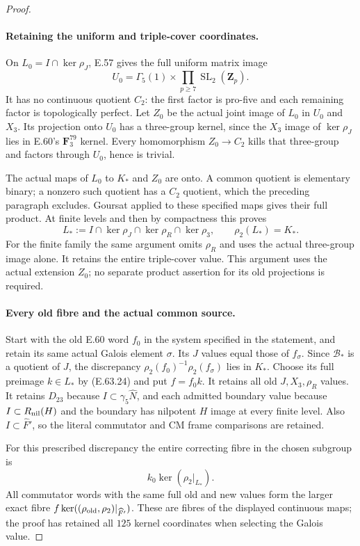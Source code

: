 \begin{proof}
\paragraph{Retaining the uniform and triple-cover coordinates.}
On $L_0=I\cap\ker\rho_J$, E.57 gives the full
uniform matrix image
\[
 U_0=\Gamma_5(1)\times
                  \prod_{p\ge7}\operatorname{SL}_2(\mathbf Z_p).
 \tag{E.63.23}
\]
It has no continuous quotient $C_2$: the first
factor is pro-five and each remaining factor is
topologically perfect. Let $Z_0$ be the actual
joint image of $L_0$ in $U_0$ and $X_3$.
Its projection onto $U_0$ has a three-group kernel,
since the $X_3$ image of $\ker\rho_J$ lies in
E.60's $\mathbf F_3^{79}$ kernel. Every homomorphism
$Z_0\to C_2$ kills that three-group and factors
through $U_0$, hence is trivial.

The actual maps of $L_0$ to $K_*$ and $Z_0$ are
onto. A common quotient is elementary binary; a
nonzero such quotient has a $C_2$ quotient, which
the preceding paragraph excludes. Goursat applied
to these specified maps gives their full product.
At finite levels and then by compactness this proves
\[
 L_*:=I\cap\ker\rho_J\cap\ker\rho_R\cap\ker\rho_3,
             \qquad\rho_2(L_*)=K_*.
 \tag{E.63.24}
\]
For the finite family the same argument omits
$\rho_R$ and uses the actual three-group image
alone. It retains the entire triple-cover value.
This argument uses the actual extension $Z_0$;
no separate product assertion for its old projections
is required.

\paragraph{Every old fibre and the actual common source.}
Start with the old E.60 word $f_0$ in the system
specified in the statement, and retain its same
actual Galois element $\sigma$. Its $J$ values
equal those of $f_\sigma$. Since
$\mathcal B_*$ is a quotient of $J$, the discrepancy
$\rho_2(f_0)^{-1}\rho_2(f_\sigma)$ lies in $K_*$.
Choose its full preimage $k\in L_*$ by
\textup{(E.63.24)} and put $f=f_0k$.
It retains all old $J,X_3,\rho_R$ values. It retains
$D_{23}$ because $I\subset\gamma_5\widehat N$,
and each admitted boundary value because
$I\subset R_{\rm nil}(H)$ and the boundary has
nilpotent $H$ image at every finite level.
Also $I\subset\widehat F'$, so the literal
commutator and CM frame comparisons are retained.

For this prescribed discrepancy the entire correcting
fibre in the chosen subgroup is
\[
                      k_0\ker(\rho_2|_{L_*}).
 \tag{E.63.25}
\]
All commutator words with the same full old and new
values form the larger exact fibre
$f\ker((\rho_{\rm old},\rho_2)|_{\widehat F'})$.
These are fibres of the displayed continuous maps;
the proof has retained all $125$ kernel coordinates
when selecting the Galois value.


\end{proof}
